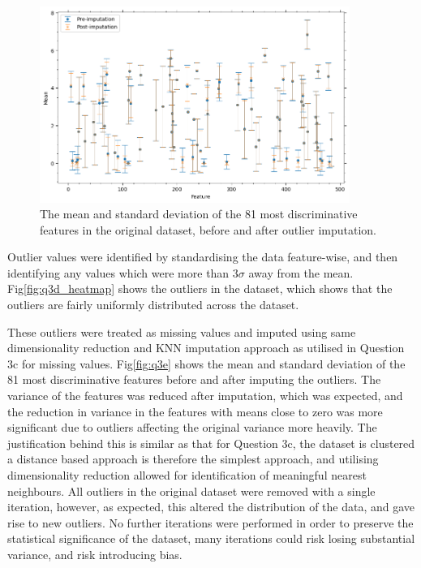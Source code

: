     \begin{figure}[htb]
    \centering
    \includegraphics[width=0.9\textwidth]{./figures/q3e}
    \caption{The mean and standard deviation of the 81 most discriminative features in the original
         dataset, before and after outlier imputation.}
    \label{fig:q3e}
    \end{figure}

    Outlier values were identified by standardising the data feature-wise, and then identifying any values which were
    more than $3\sigma$ away from the mean.
    Fig\eqref{fig:q3d_heatmap} shows the outliers in the dataset, which shows that the outliers are fairly uniformly
    distributed across the dataset.

    These outliers were treated as missing values and imputed using same dimensionality reduction and KNN imputation
    approach as utilised in Question 3c for missing values.
    Fig\eqref{fig:q3e} shows the mean and standard deviation of the 81 most discriminative features before and after
    imputing the outliers.
    The variance of the features was reduced after imputation, which was expected, and the reduction in variance in the
    features with means close to zero was more significant due to outliers affecting the original variance more heavily.
    The justification behind this is similar as that for Question 3c, the dataset is clustered a distance based
    approach is therefore the simplest approach, and utilising dimensionality reduction allowed for identification of
    meaningful nearest neighbours.
    All outliers in the original dataset were removed with a single iteration, however, as expected, this altered the
    distribution of the data, and gave rise to new outliers.
    No further iterations were performed in order to preserve the statistical significance of the dataset, many iterations
    could risk losing substantial variance, and risk introducing bias.
